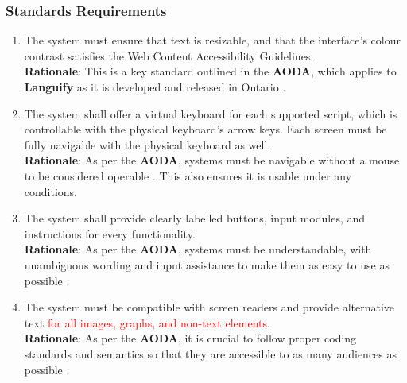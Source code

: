 \subsubsection{Standards Requirements}
\label{ssub:standards_requirements}
\begin{enumerate}[{LR-STD}1. ]
	\item The system must ensure that text is resizable, and that the interface’s colour contrast satisfies the Web Content Accessibility Guidelines.
	\\ \textbf{Rationale}: This is a key standard outlined in the \textbf{AODA}, which applies to \textbf{Languify} as it is developed and released in Ontario \cite{Speedtest2025}.
	\item The system shall offer a virtual keyboard for each supported script, which is controllable with the physical keyboard’s arrow keys. Each screen must be fully navigable with the physical keyboard as well.
	\\ \textbf{Rationale}: As per the \textbf{AODA}, systems must be navigable without a mouse to be considered operable \cite{Speedtest2025}. This also ensures it is usable under any conditions.
	\item The system shall provide clearly labelled buttons, input modules, and instructions for every functionality.
	\\ \textbf{Rationale}: As per the \textbf{AODA}, systems must be understandable, with unambiguous wording and input assistance to make them as easy to use as possible \cite{AODA2025}.
	\item The system must be compatible with screen readers and provide alternative text \textcolor{red}{for all images, graphs, and non-text elements}.
	\\ \textbf{Rationale}: As per the \textbf{AODA}, it is crucial to follow proper coding standards and semantics so that they are accessible to as many audiences as possible \cite{AODA2025}.
\end{enumerate}


